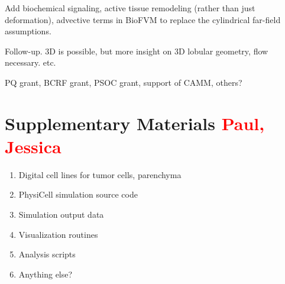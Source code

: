 \documentclass[smallextended,natbib]{svjour3}
\newcommand{\red}[1]{\textcolor{red}{#1}}
\begin{document}
Add biochemical signaling, active tissue remodeling (rather than just deformation), advective terms in BioFVM to replace 
the cylindrical far-field assumptions. 

Follow-up. 3D is possible, but more insight on 3D lobular geometry, flow necessary. etc. 


\begin{acknowledgements}
PQ grant, BCRF grant, PSOC grant, support of CAMM, others?
\end{acknowledgements}

\section{Supplementary Materials \red{Paul, Jessica}}
\begin{enumerate}
\item 
Digital cell lines for tumor cells, parenchyma 
\item 
PhysiCell simulation source code
\item 
Simulation output data
\item 
Visualization routines 
\item 
Analysis scripts 
\item 
Anything else? 
\end{enumerate}


\end{document}
